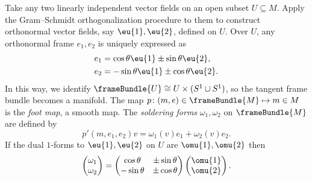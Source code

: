 Take any two linearly independent vector fields  on an open subset \(U\subseteq M\).
Apply the Gram--Schmidt orthogonalization procedure to them to construct orthonormal vector fields, say \(\eu{1}, \eu{2}\), defined on \(U\).
Over \(U\), any orthonormal frame \(e_1,e_2\) is uniquely expressed as
\begin{align*}
e_1&=\cos \theta \eu{1} \pm \sin \theta \eu{2},\\
e_2&=-\sin \theta \eu{1} \pm \cos \theta \eu{2}.
\end{align*}
In this way, we identify \(\frameBundle{U}\cong U \times (S^1 \cup S^1)\), so the tangent frame bundle becomes a manifold.
The map \(p \colon (m,e) \in \frameBundle{M} \mapsto m \in M\) is the \emph{foot map}, a smooth map.
The \emph{soldering forms} \(\omega_1,\omega_2\) on \(\frameBundle{M}\) are defined by
\[
p'(m,e_1,e_2)v=\omega_1(v)e_1+\omega_2(v)e_2.
\]
If the dual \(1\)-forms to \(\eu{1},\eu{2}\) on \(U\) are \(\omu{1},\omu{2}\) then
\[
\begin{pmatrix}
\omega_1\\
\omega_2
\end{pmatrix}
=
\begin{pmatrix}
\cos \theta  & \pm \sin \theta \\
-\sin \theta & \pm \cos \theta
\end{pmatrix}
\begin{pmatrix}
\omu{1}\\
\omu{2}
\end{pmatrix}.
\]

